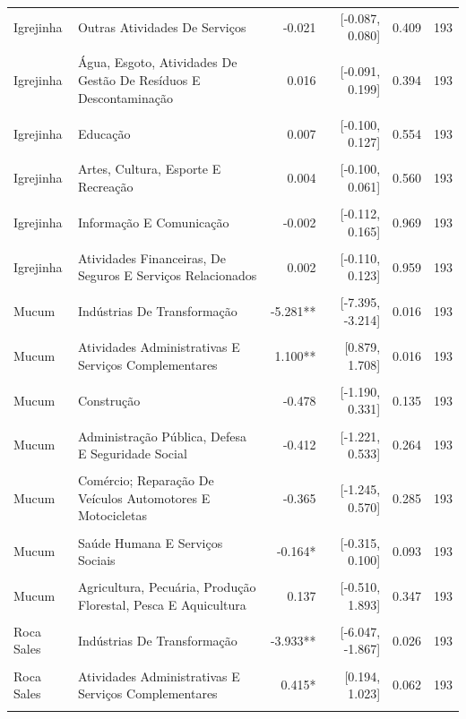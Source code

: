 \begin{tabular}{llrrrr}
Igrejinha & Outras Atividades De Serviços & -0.021 & [-0.087, 0.080] & 0.409 & 193 \\\\
Igrejinha & Água, Esgoto, Atividades De Gestão De Resíduos E Descontaminação & 0.016 & [-0.091, 0.199] & 0.394 & 193 \\\\
Igrejinha & Educação & 0.007 & [-0.100, 0.127] & 0.554 & 193 \\\\
Igrejinha & Artes, Cultura, Esporte E Recreação & 0.004 & [-0.100, 0.061] & 0.560 & 193 \\\\
Igrejinha & Informação E Comunicação & -0.002 & [-0.112, 0.165] & 0.969 & 193 \\\\
Igrejinha & Atividades Financeiras, De Seguros E Serviços Relacionados & 0.002 & [-0.110, 0.123] & 0.959 & 193 \\\\
Mucum & Indústrias De Transformação & -5.281** & [-7.395, -3.214] & 0.016 & 193 \\\\
Mucum & Atividades Administrativas E Serviços Complementares & 1.100** & [0.879, 1.708] & 0.016 & 193 \\\\
Mucum & Construção & -0.478 & [-1.190, 0.331] & 0.135 & 193 \\\\
Mucum & Administração Pública, Defesa E Seguridade Social & -0.412 & [-1.221, 0.533] & 0.264 & 193 \\\\
Mucum & Comércio; Reparação De Veículos Automotores E Motocicletas & -0.365 & [-1.245, 0.570] & 0.285 & 193 \\\\
Mucum & Saúde Humana E Serviços Sociais & -0.164* & [-0.315, 0.100] & 0.093 & 193 \\\\
Mucum & Agricultura, Pecuária, Produção Florestal, Pesca E Aquicultura & 0.137 & [-0.510, 1.893] & 0.347 & 193 \\\\
Roca Sales & Indústrias De Transformação & -3.933** & [-6.047, -1.867] & 0.026 & 193 \\\\
Roca Sales & Atividades Administrativas E Serviços Complementares & 0.415* & [0.194, 1.023] & 0.062 & 193 \\\\

\end{tabular}
